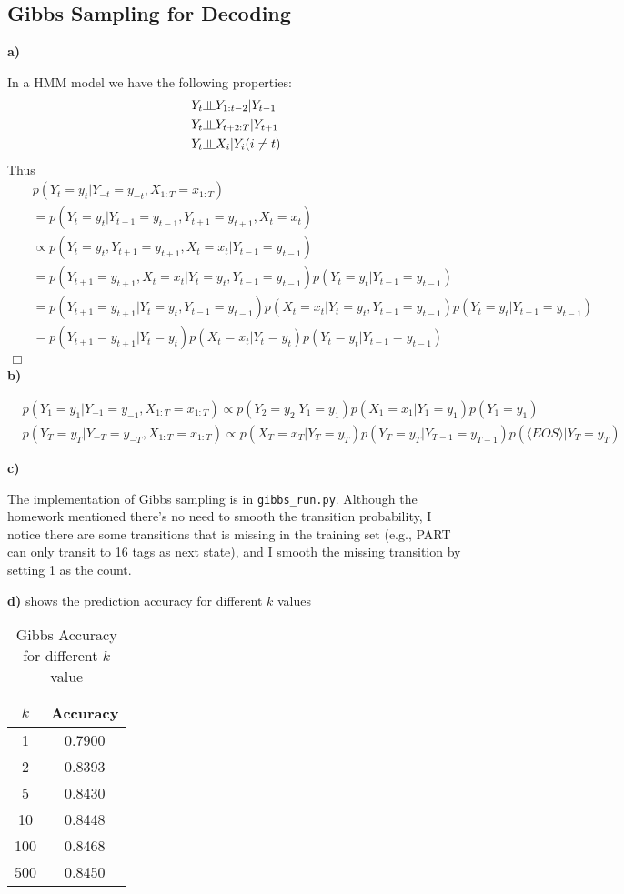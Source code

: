 \documentclass{article}
\newcommand{\indep}{\rotatebox[origin=c]{90}{$\models$}}
\begin{document}
\subsection{Gibbs Sampling for Decoding}
\textbf{a)}

In a HMM model we have the following properties:
\begin{align*}
&Y_t \indep Y_{1:t-2} | Y_{t-1}\\
&Y_t \indep Y_{t+2:T}| Y_{t+1}\\
&Y_t \indep X_i | Y_i (i \neq t)
\end{align*}
Thus
\begin{align*}
&p(Y_t = y_t|Y_{-t} = y_{-t}, X_{1:T} = x_{1:T}) \\
&= p(Y_t = y_t|Y_{t-1}=y_{t-1},Y_{t+1} = y_{t+1}, X_{t}=x_{t})\\
&\propto p(Y_t = y_t, Y_{t+1} = y_{t+1}, X_t = x_t | Y_{t-1} = y_{t-1})\\
&= p(Y_{t+1} = y_{t+1}, X_t = x_t | Y_t = y_t, Y_{t-1} = y_{t-1})p(Y_t = y_t|Y_{t-1} = y_{t-1}) \\
&=p(Y_{t+1}=y_{t+1}|Y_t = y_t, Y_{t-1} = y_{t-1})p(X_{t}=x_{t}|Y_t = y_t, Y_{t-1} = y_{t-1})p(Y_t = y_t|Y_{t-1} = y_{t-1})\\
&=p(Y_{t+1}=y_{t+1}|Y_t = y_t)p(X_{t}=x_{t}|Y_t = y_t)p(Y_t = y_t|Y_{t-1} = y_{t-1})\\
\Box
\end{align*}
\textbf{b)}

\begin{align*}
&p(Y_1 = y_1 |Y_{-1}=y_{-1}, X_{1:T} = x_{1:T}) \propto p(Y_2 = y_2|Y_1 = y_1)p(X_1 = x_1|Y_1 = y_1)p(Y_1 = y_1)\\
&p(Y_T = y_T|Y_{-T}=y_{-T},X_{1:T} = x_{1:T}) \propto p(X_T = x_T|Y_T = y_T)p(Y_T = y_T|Y_{T-1} = y_{T-1})p(\langle EOS\rangle|Y_T = y_T)
\end{align*}

\textbf{c)}

The implementation of Gibbs sampling is in \texttt{gibbs\_run.py}. Although the homework mentioned there's no need
to smooth the transition probability, I notice there are some transitions that is missing in the training set (e.g., PART 
can only transit to 16 tags as next state), and I smooth the missing transition by setting 1 as the count.

\textbf{d)}
 shows the prediction accuracy for different $k$ values
\begin{table}
\centering
\begin{tabular}{c|c}
\textbf{$k$}&\textbf{Accuracy}\\\hline
1 & 0.7900\\\hline
2 & 0.8393\\\hline
5 & 0.8430\\\hline
10 & 0.8448\\\hline
100 & 0.8468\\\hline
500 & 0.8450\\\hline

\end{tabular}
\caption{Gibbs Accuracy for different $k$ value}
\label{tab:gibbs}
\end{table}
\end{document}
